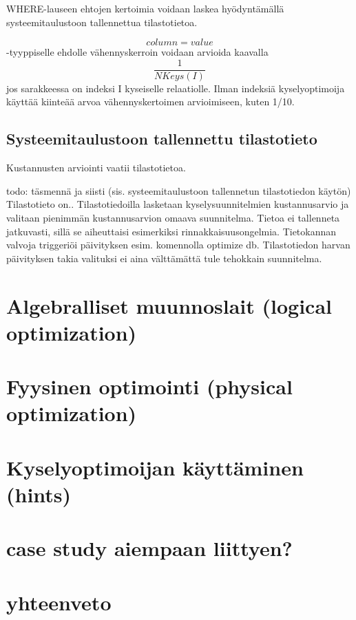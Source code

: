 \documentclass[finnish]{tktltiki2}
\theoremstyle{definition}
\theoremstyle{remark}
\begin{document}
WHERE-lauseen ehtojen kertoimia voidaan laskea hyödyntämällä systeemitaulustoon tallennettua tilastotietoa.

\begin{equation}
column = value
\end{equation}
-tyyppiselle ehdolle vähennyskerroin voidaan arvioida kaavalla
\begin{equation}
\frac{1}{NKeys(I)}
\end{equation}
jos sarakkeessa on indeksi I kyseiselle relaatiolle. Ilman indeksiä kyselyoptimoija käyttää kiinteää arvoa vähennyskertoimen arvioimiseen, kuten 1/10.

\subsection{Systeemitaulustoon tallennettu tilastotieto}
Kustannusten arviointi vaatii tilastotietoa. \cite{ramakrishnan2003database}

todo: täsmennä ja siisti
(sis. systeemitaulustoon tallennetun tilastotiedon käytön)
Tilastotieto on..
Tilastotiedoilla lasketaan kyselysuunnitelmien kustannusarvio ja valitaan pienimmän kustannusarvion omaava suunnitelma.
Tietoa ei tallenneta jatkuvasti, sillä se aiheuttaisi esimerkiksi rinnakkaisuusongelmia. Tietokannan valvoja 
triggeriöi päivityksen esim. komennolla optimize db. Tilastotiedon harvan päivityksen takia valituksi ei aina välttämättä tule 
tehokkain suunnitelma.

\section{Algebralliset muunnoslait (logical optimization)} %
\section{Fyysinen optimointi (physical optimization)}
\section{Kyselyoptimoijan käyttäminen (hints)}
\section{case study aiempaan liittyen?}
\section{yhteenveto}



%
%
% 
%

%


\end{document}
